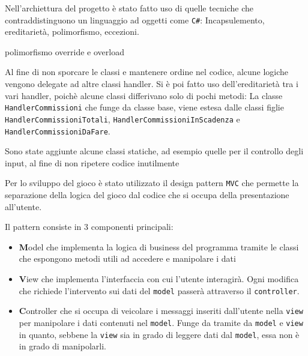 \vspace{0.5cm}
Nell'archiettura del progetto è stato fatto uso di quelle tecniche che contraddistinguono un linguaggio
ad oggetti come \texttt{C\#}: Incapsulemento, ereditarietà, polimorfismo, eccezioni.

 \vspace{0.5cm}
 polimorfismo
 \vspace{0.5cm}
 override e overload
 \vspace{0.5cm}



Al fine di non sporcare le classi e mantenere ordine nel codice, alcune logiche vengono delegate ad altre classi handler.
Si è poi fatto uso dell'ereditarietà tra i vari handler, poichè alcune classi differivano solo di pochi metodi: 
La classe \texttt{HandlerCommissioni} che funge da classe base, viene estesa dalle classi figlie \texttt{HandlerCommissioniTotali},
\texttt{HandlerCommissioniInScadenza} e \texttt{HandlerCommissioniDaFare}.

Sono state aggiunte alcune classi statiche, ad esempio quelle per il controllo degli input, al fine di non ripetere codice
inutilmente





Per lo sviluppo del gioco è stato utilizzato il design pattern \texttt{MVC} che permette la separazione della logica del gioco dal codice che si occupa della presentazione all'utente.

Il pattern consiste in 3 componenti principali:
\begin{itemize}
    \item \textbf{M}odel che implementa la logica di business del programma tramite le classi che espongono metodi utili ad accedere e manipolare i dati

    \item \textbf{V}iew che implementa l'interfaccia con cui l'utente interagirà. Ogni modifica che richiede l'intervento sui dati del \texttt{model} passerà attraverso il \texttt{controller}.

    \item \textbf{C}ontroller che si occupa di veicolare i messaggi inseriti dall'utente nella \texttt{view} per manipolare i dati contenuti nel \texttt{model}.
          Funge da tramite da \texttt{model} e \texttt{view} in quanto, sebbene la \texttt{view} sia in grado di leggere dati dal \texttt{model}, essa non è in grado di manipolarli.
\end{itemize}

